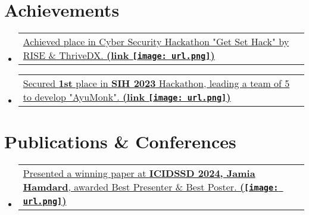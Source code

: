 \documentclass[a4paper,11pt]{article}
\makeatletter
\newcommand{\resumePORA}[3]{
	\vspace{0.5mm}\item
	\begin{tabular*}{0.97\textwidth}[t]{l@{\extracolsep{\fill}}r}
		{#1}\hspace{0.3mm}#2 & \textit{\small{#3}} 
	\end{tabular*}
	\vspace{-2mm}
}
\newcommand{\resumeSubHeadingListStart}{\begin{itemize}[leftmargin=*,labelsep=0mm]}
\newcommand{\resumeSubHeadingListEnd}{\end{itemize}\vspace{2mm}}
\newcommand{\customtext}[1]{{\sffamily\bfseries #1}}
\makeatother
\begin{document}
\section{\textbf{Achievements}}
\vspace{-0.4mm}
\resumeSubHeadingListStart
 
\resumePORA{  \href{https://drive.google.com/file/d/1Tpn3K8eK5zJWloIA06yOFw7PCoLqy-3t/view}{Achieved \thinspace{\customtext{\textbf{\textcolor{sand}{5th}}}} place in Cyber Security Hackathon "Get Set Hack" by RISE \& ThriveDX. {\color{gray}\textbf{(link \texttt{[image: url.png]})}}} } %
    {} %
    {} %
    
\vspace{-1.5mm}
\resumePORA{  \href{https://drive.google.com/file/d/1lbA1B5IqrB63UNGqP2AWA_5tU-p_JPjT/view}{{Secured \customtext{\textbf{\textcolor{sand}{1st}}}} place in {\customtext{\textbf{\textcolor{sand}{SIH 2023}}}} Hackathon, leading a team of 5 to develop "AyuMonk". {\color{gray}\textbf{(link \texttt{[image: url.png]})}}} } %
    {} %
    {} %

\resumeSubHeadingListEnd
\vspace{-4.4mm}



\section{\textbf{Publications \& Conferences}}
\vspace{-0.4mm}
\resumeSubHeadingListStart

\resumePORA{  \href{https://drive.google.com/file/d/1jHHO7sfI8_siICWUdF21CH2A8n44mG2_/view?usp=sharing}{Presented a winning paper at {\customtext{\textbf{\textcolor{sand}{ICIDSSD 2024, Jamia Hamdard}}}}, awarded Best Presenter \& Best Poster. {\color{gray}\textbf{(\texttt{[image: url.png]})}}} } %
{} %
{} %

\resumeSubHeadingListEnd
\vspace{-4.4mm}



\end{document}

